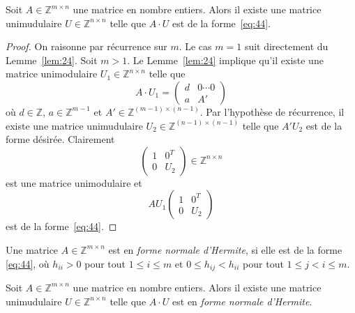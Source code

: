   \begin{corollary}
    \label{co:9}
    Soit  $A ∈ℤ^{ m ×n}$ une matrice en nombre entiers. Alors il  existe une matrice unimudulaire $U ∈ℤ^{ n ×n}$ telle que $A ⋅U$ est de la forme~\eqref{eq:44}.
  \end{corollary}
  \begin{proof}
    On raisonne par récurrence sur $m$. Le cas $m=1$ suit directement du Lemme~\ref{lem:24}. Soit $m>1$. 
    Le Lemme~\ref{lem:24} implique qu'il existe une matrice unimodulaire $U_1 ∈ℤ^{n ×n}$ telle que
    \begin{displaymath}
      A ⋅ U_1 =
      \begin{pmatrix}
        d & 0 \cdots 0 \\
        a  & A'
      \end{pmatrix}
    \end{displaymath}
    où $d ∈ℤ$, $a ∈ ℤ^{m-1}$ et $A' ∈ ℤ^{(m-1) × (n-1)}$. Par l'hypothèse de récurrence, il existe une matrice unimudulaire $U_2 ∈ℤ^{(n-1) ×(n-1)}$ telle que $A' U_2$ est de la forme désirée. Clairement
      \begin{displaymath}
         \begin{pmatrix}
          1 & 0^T \\
          0 & U_2
        \end{pmatrix} ∈ℤ^{n ×n}
      \end{displaymath}
      est une matrice unimodulaire et 
      \begin{displaymath}
        A U_1
        \begin{pmatrix}
          1 & 0^T \\
          0 & U_2
        \end{pmatrix}
      \end{displaymath}
      est de la  forme~\eqref{eq:44}. 
  \end{proof}



  \begin{definition}
    \label{def:60}
    Une matrice $A ∈ℤ^{m ×n}$  est en \emph{forme normale d'Hermite}, si elle est de la forme \eqref{eq:44}, où $h_{ii}>0$ pour tout $1 ≤i≤ m$ et $0≤ h_{ij} < h_{ii}$ pour tout $1≤j<i≤m$. 
  \end{definition}
	
\begin{theorem}
  \label{thr:28}
    Soit  $A ∈ℤ^{ m ×n}$ une matrice en nombre entiers. Alors il  existe une matrice unimudulaire $U ∈ℤ^{ n ×n}$ telle que $A ⋅U$ est en \emph{forme normale d'Hermite}.
  \end{theorem}
  
